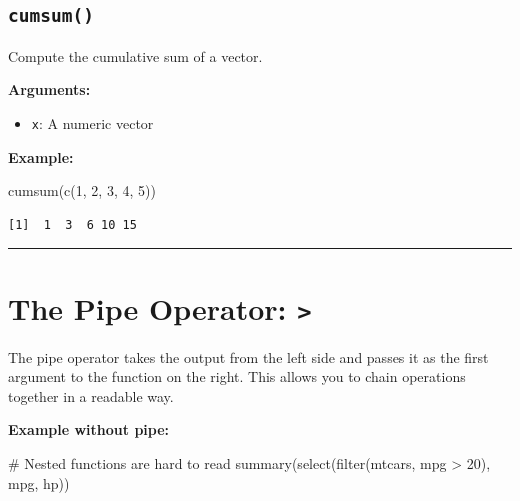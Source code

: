 \documentclass[
  letterpaper,
  DIV=11,
  numbers=noendperiod]{scrreprt}
\newenvironment{Shaded}{\begin{snugshade}}{\end{snugshade}}
\newcommand{\CommentTok}[1]{\textcolor[rgb]{0.37,0.37,0.37}{#1}}
\newcommand{\DecValTok}[1]{\textcolor[rgb]{0.68,0.00,0.00}{#1}}
\newcommand{\FunctionTok}[1]{\textcolor[rgb]{0.28,0.35,0.67}{#1}}
\newcommand{\NormalTok}[1]{\textcolor[rgb]{0.00,0.23,0.31}{#1}}
\newcommand{\SpecialCharTok}[1]{\textcolor[rgb]{0.37,0.37,0.37}{#1}}
\providecommand{\tightlist}{%
  \setlength{\itemsep}{0pt}\setlength{\parskip}{0pt}}
\begin{document}
\subsection{\texorpdfstring{\texttt{cumsum()}}{cumsum()}}\label{cumsum}

Compute the cumulative sum of a vector.

\textbf{Arguments:}

\begin{itemize}
\tightlist
\item
  \texttt{x}: A numeric vector
\end{itemize}

\textbf{Example:}

\begin{Shaded}
\begin{Highlighting}[]
\FunctionTok{cumsum}\NormalTok{(}\FunctionTok{c}\NormalTok{(}\DecValTok{1}\NormalTok{, }\DecValTok{2}\NormalTok{, }\DecValTok{3}\NormalTok{, }\DecValTok{4}\NormalTok{, }\DecValTok{5}\NormalTok{))}
\end{Highlighting}
\end{Shaded}

\begin{verbatim}
[1]  1  3  6 10 15
\end{verbatim}

\begin{center}\rule{0.5\linewidth}{0.5pt}\end{center}

\section{\texorpdfstring{The Pipe Operator:
\texttt{\textbar{}\textgreater{}}}{The Pipe Operator: \textbar\textgreater{}}}\label{the-pipe-operator-1}

The pipe operator takes the output from the left side and passes it as
the first argument to the function on the right. This allows you to
chain operations together in a readable way.

\textbf{Example without pipe:}

\begin{Shaded}
\begin{Highlighting}[]
\CommentTok{\# Nested functions are hard to read}
\FunctionTok{summary}\NormalTok{(}\FunctionTok{select}\NormalTok{(}\FunctionTok{filter}\NormalTok{(mtcars, mpg }\SpecialCharTok{\textgreater{}} \DecValTok{20}\NormalTok{), mpg, hp))}
\end{Highlighting}
\end{Shaded}
\end{document}
